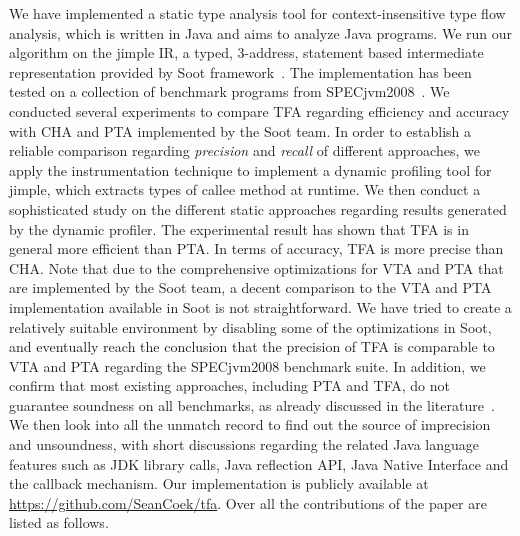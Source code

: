 \documentclass{fac}
\begin{document}
We have implemented a static type analysis tool for context-insensitive type flow analysis, which is written in Java and aims to analyze Java programs. We run our algorithm on the jimple IR, a typed, 3-address, statement based intermediate representation provided by Soot framework~\cite{soot}. The implementation has been tested on a collection of benchmark programs from SPECjvm2008~\cite{specjvm}. We conducted several experiments to compare TFA regarding efficiency and accuracy with CHA and PTA implemented by the Soot team. In order to establish a reliable comparison regarding \emph{precision} and \emph{recall} of different approaches, we apply the instrumentation technique to implement a dynamic profiling tool for jimple, which extracts types of callee method at runtime. We then conduct a sophisticated study on the different static approaches regarding results generated by the dynamic profiler. The experimental result has shown that TFA is in general more efficient than PTA. In terms of accuracy, TFA is more precise than CHA. Note that due to the comprehensive optimizations for VTA and PTA that are implemented by the Soot team, a decent comparison to the VTA and PTA implementation available in Soot is not straightforward. We have tried to create a relatively suitable environment by disabling some of the optimizations in Soot, and eventually reach the conclusion that the precision of TFA is comparable to VTA and PTA regarding the SPECjvm2008 benchmark suite. In addition, we confirm that most existing approaches, including PTA and TFA, do not guarantee soundness on all benchmarks, as already discussed in the literature~\cite{LivshitsSSLACGKMV15}. We then look into all the unmatch record to find out the source of imprecision and unsoundness, with short discussions regarding the related Java language features such as JDK library calls, Java reflection API, Java Native Interface and the callback mechanism. %
Our implementation is publicly available at \url{https://github.com/SeanCoek/tfa}.
%
Over all the contributions of the paper are listed as follows.
\end{document}
